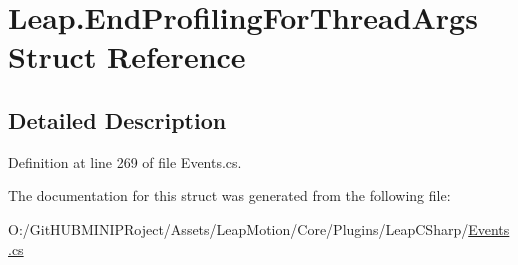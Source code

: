 \hypertarget{struct_leap_1_1_end_profiling_for_thread_args}{}\section{Leap.\+End\+Profiling\+For\+Thread\+Args Struct Reference}
\label{struct_leap_1_1_end_profiling_for_thread_args}


\subsection{Detailed Description}


Definition at line 269 of file Events.\+cs.



The documentation for this struct was generated from the following file\+:\begin{DoxyCompactItemize}
\item 
O\+:/\+Git\+H\+U\+B\+M\+I\+N\+I\+P\+Roject/\+Assets/\+Leap\+Motion/\+Core/\+Plugins/\+Leap\+C\+Sharp/\mbox{\hyperlink{_events_8cs}{Events.\+cs}}\end{DoxyCompactItemize}
